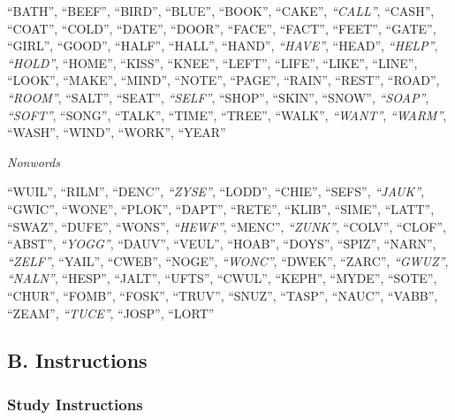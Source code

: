 \documentclass[english,,man]{apa6}
\begin{document}
\enquote{BATH}, \enquote{BEEF}, \enquote{BIRD}, \enquote{BLUE}, \enquote{BOOK}, \enquote{CAKE}, \emph{\enquote{CALL}}, \enquote{CASH}, \enquote{COAT}, \enquote{COLD}, \enquote{DATE}, \enquote{DOOR}, \enquote{FACE}, \enquote{FACT}, \enquote{FEET}, \enquote{GATE}, \enquote{GIRL}, \enquote{GOOD}, \enquote{HALF}, \enquote{HALL}, \enquote{HAND}, \emph{\enquote{HAVE}}, \enquote{HEAD}, \emph{\enquote{HELP}}, \emph{\enquote{HOLD}}, \enquote{HOME}, \enquote{KISS}, \enquote{KNEE}, \enquote{LEFT}, \enquote{LIFE}, \enquote{LIKE}, \enquote{LINE}, \enquote{LOOK}, \enquote{MAKE}, \enquote{MIND}, \enquote{NOTE}, \enquote{PAGE}, \enquote{RAIN}, \enquote{REST}, \enquote{ROAD}, \emph{\enquote{ROOM}}, \enquote{SALT}, \enquote{SEAT}, \emph{\enquote{SELF}}, \enquote{SHOP}, \enquote{SKIN}, \enquote{SNOW}, \emph{\enquote{SOAP}}, \emph{\enquote{SOFT}}, \enquote{SONG}, \enquote{TALK}, \enquote{TIME}, \enquote{TREE}, \enquote{WALK}, \emph{\enquote{WANT}}, \emph{\enquote{WARM}}, \enquote{WASH}, \enquote{WIND}, \enquote{WORK}, \enquote{YEAR}

\emph{Nonwords}

\enquote{WUIL}, \enquote{RILM}, \enquote{DENC}, \emph{\enquote{ZYSE}}, \enquote{LODD}, \enquote{CHIE}, \enquote{SEFS}, \emph{\enquote{JAUK}}, \enquote{GWIC}, \enquote{WONE}, \enquote{PLOK}, \enquote{DAPT}, \enquote{RETE}, \enquote{KLIB}, \enquote{SIME}, \enquote{LATT}, \enquote{SWAZ}, \enquote{DUFE}, \enquote{WONS}, \emph{\enquote{HEWF}}, \enquote{MENC}, \emph{\enquote{ZUNK}}, \enquote{COLV}, \enquote{CLOF}, \enquote{ABST}, \emph{\enquote{YOGG}}, \enquote{DAUV}, \enquote{VEUL}, \enquote{HOAB}, \enquote{DOYS}, \enquote{SPIZ}, \enquote{NARN}, \emph{\enquote{ZELF}}, \enquote{YAIL}, \enquote{CWEB}, \enquote{NOGE}, \emph{\enquote{WONC}}, \enquote{DWEK}, \enquote{ZARC}, \emph{\enquote{GWUZ}}, \emph{\enquote{NALN}}, \enquote{HESP}, \enquote{JALT}, \enquote{UFTS}, \enquote{CWUL}, \enquote{KEPH}, \enquote{MYDE}, \enquote{SOTE}, \enquote{CHUR}, \enquote{FOMB}, \enquote{FOSK}, \enquote{TRUV}, \enquote{SNUZ}, \enquote{TASP}, \enquote{NAUC}, \enquote{VABB}, \enquote{ZEAM}, \emph{\enquote{TUCE}}, \enquote{JOSP}, \enquote{LORT}

\hypertarget{b.-instructions}{%
\subsection{B. Instructions}\label{b.-instructions}}

\hypertarget{study-instructions}{%
\subsubsection{Study Instructions}\label{study-instructions}}
\end{document}
